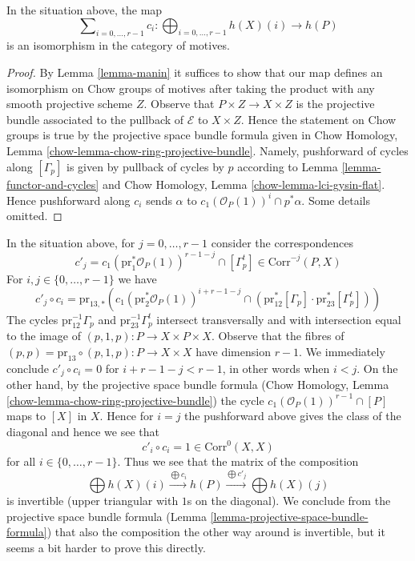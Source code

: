 \begin{lemma}
\label{lemma-projective-space-bundle-formula}
In the situation above, the map
$$
\sum\nolimits_{i = 0, \ldots, r - 1} c_i :
\bigoplus\nolimits_{i = 0, \ldots, r - 1} h(X)(i)
\longrightarrow
h(P)
$$
is an isomorphism in the category of motives.
\end{lemma}

\begin{proof}
By Lemma \ref{lemma-manin} it suffices to show that
our map defines an isomorphism on Chow groups of motives
after taking the product with any smooth projective scheme $Z$.
Observe that $P \times Z \to X \times Z$ is the projective
bundle associated to the pullback of $\mathcal{E}$ to $X \times Z$.
Hence the statement on Chow groups is true by the projective space bundle
formula given in
Chow Homology, Lemma \ref{chow-lemma-chow-ring-projective-bundle}.
Namely, pushforward of cycles along $[\Gamma_p]$ is given by pullback
of cycles by $p$ according to Lemma \ref{lemma-functor-and-cycles} and
Chow Homology, Lemma \ref{chow-lemma-lci-gysin-flat}. Hence pushforward
along $c_i$ sends $\alpha$ to $c_1(\mathcal{O}_P(1))^i \cap p^*\alpha$.
Some details omitted.
\end{proof}

\noindent
In the situation above, for $j = 0, \ldots, r - 1$ consider
the correspondences
$$
c'_j = c_1(\text{pr}_1^*\mathcal{O}_P(1))^{r - 1 - j} \cap [\Gamma_p^t] \in
\text{Corr}^{-j}(P, X)
$$
For $i, j \in \{0, \ldots, r - 1\}$ we have
$$
c'_j \circ c_i =
\text{pr}_{13, *}\left(
c_1(\text{pr}_2^*\mathcal{O}_P(1))^{i + r - 1 - j} \cap
(\text{pr}_{12}^*[\Gamma_p] \cdot \text{pr}_{23}^*[\Gamma_p^t])
\right)
$$
The cycles $\text{pr}_{12}^{-1}\Gamma_p$ and 
$\text{pr}_{23}^{-1}\Gamma_p^t$ intersect transversally and
with intersection equal to the image of
$(p, 1, p) : P \to X \times P \times X$.
Observe that the fibres of
$(p, p) = \text{pr}_{13} \circ (p, 1, p) : P \to X \times X$
have dimension $r - 1$. We immediately conclude
$c'_j \circ c_i = 0$ for $i + r - 1 - j < r - 1$, in other words when $i < j$.
On the other hand, by the projective space bundle formula
(Chow Homology, Lemma \ref{chow-lemma-chow-ring-projective-bundle})
the cycle $c_1(\mathcal{O}_P(1))^{r - 1} \cap [P]$ maps
to $[X]$ in $X$. Hence for $i = j$ the pushforward above
gives the class of the diagonal and hence
we see that
$$
c'_i \circ c_i = 1 \in \text{Corr}^0(X, X)
$$
for all $i \in \{0, \ldots, r - 1\}$. Thus we see that the matrix
of the composition
$$
\bigoplus h(X)(i)
\xrightarrow{\bigoplus c_i}
h(P)
\xrightarrow{\bigoplus c'_j}
\bigoplus h(X)(j)
$$
is invertible (upper triangular with $1$s on the diagonal).
We conclude from the projective space bundle formula
(Lemma \ref{lemma-projective-space-bundle-formula})
that also the composition the other way around is
invertible, but it seems a bit harder to prove this directly.

